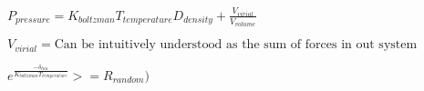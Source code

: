\documentclass[12pt]{article}
\begin{document}
$P_{pressure} = K_{boltzman}T_{temperature}D_{density} +
\frac{V_{virial}}{V_{volume}} $

\pagebreak[4]

$V_{virial}=\textrm{Can be intuitively understood as the sum of forces in out system}$

\pagebreak[4]

$e^{\frac{-\delta_{tau}}{K_{boltzman}T_{temperature}}} >= R_{random}) $
\end{document}
